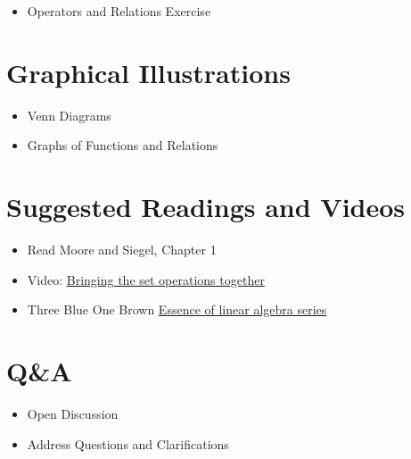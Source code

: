 \documentclass[
  11pt,
  letterpaper,
  DIV=11,
  numbers=noendperiod]{scrartcl}
\providecommand{\tightlist}{%
  \setlength{\itemsep}{0pt}\setlength{\parskip}{0pt}}\usepackage{longtable,booktabs,array}
\begin{document}
\begin{itemize}
\tightlist
\item
  Operators and Relations Exercise
\end{itemize}

\section{Graphical Illustrations}\label{graphical-illustrations}

\begin{itemize}
\tightlist
\item
  Venn Diagrams
\end{itemize}

\begin{itemize}
\tightlist
\item
  Graphs of Functions and Relations
\end{itemize}

\section{Suggested Readings and
Videos}\label{suggested-readings-and-videos}

\begin{itemize}
\tightlist
\item
  Read Moore and Siegel, Chapter 1
\end{itemize}

\begin{itemize}
\tightlist
\item
  Video:
  \href{https://www.youtube.com/watch?v=OCNXS_m1HWU&list=PLwPDkKEXCNflNrtW4uG2mcOY1Q0ByREuP}{Bringing
  the set operations together}
\item
  Three Blue One Brown
  \href{https://www.youtube.com/watch?v=kjBOesZCoqc&list=PL0-GT3co4r2y2YErbmuJw2L5tW4Ew2O5B}{Essence
  of linear algebra series}
\end{itemize}

\section{Q\&A}\label{qa}

\begin{itemize}
\tightlist
\item
  Open Discussion
\end{itemize}

\begin{itemize}
\tightlist
\item
  Address Questions and Clarifications
\end{itemize}
\end{document}
